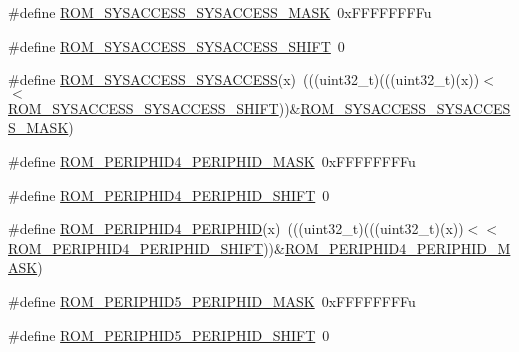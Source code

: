 \begin{DoxyCompactItemize}
\item 
\#define \hyperlink{group___r_o_m___register___masks_gab3acbf5e9fc0f3ad82ae4e0004d0216d}{R\+O\+M\+\_\+\+S\+Y\+S\+A\+C\+C\+E\+S\+S\+\_\+\+S\+Y\+S\+A\+C\+C\+E\+S\+S\+\_\+\+M\+A\+SK}~0x\+F\+F\+F\+F\+F\+F\+F\+Fu
\item 
\#define \hyperlink{group___r_o_m___register___masks_ga3490b2f91c6a67625992dbc90f0e5a27}{R\+O\+M\+\_\+\+S\+Y\+S\+A\+C\+C\+E\+S\+S\+\_\+\+S\+Y\+S\+A\+C\+C\+E\+S\+S\+\_\+\+S\+H\+I\+FT}~0
\item 
\#define \hyperlink{group___r_o_m___register___masks_ga169845d2d1c068c7ef4998e8801ac713}{R\+O\+M\+\_\+\+S\+Y\+S\+A\+C\+C\+E\+S\+S\+\_\+\+S\+Y\+S\+A\+C\+C\+E\+SS}(x)~(((uint32\+\_\+t)(((uint32\+\_\+t)(x))$<$$<$\hyperlink{group___r_o_m___register___masks_ga3490b2f91c6a67625992dbc90f0e5a27}{R\+O\+M\+\_\+\+S\+Y\+S\+A\+C\+C\+E\+S\+S\+\_\+\+S\+Y\+S\+A\+C\+C\+E\+S\+S\+\_\+\+S\+H\+I\+FT}))\&\hyperlink{group___r_o_m___register___masks_gab3acbf5e9fc0f3ad82ae4e0004d0216d}{R\+O\+M\+\_\+\+S\+Y\+S\+A\+C\+C\+E\+S\+S\+\_\+\+S\+Y\+S\+A\+C\+C\+E\+S\+S\+\_\+\+M\+A\+SK})
\item 
\#define \hyperlink{group___r_o_m___register___masks_gad17e07925ea552218422be227581a58f}{R\+O\+M\+\_\+\+P\+E\+R\+I\+P\+H\+I\+D4\+\_\+\+P\+E\+R\+I\+P\+H\+I\+D\+\_\+\+M\+A\+SK}~0x\+F\+F\+F\+F\+F\+F\+F\+Fu
\item 
\#define \hyperlink{group___r_o_m___register___masks_ga4ea3b3a45be6eb8eb4372f565af2d5d9}{R\+O\+M\+\_\+\+P\+E\+R\+I\+P\+H\+I\+D4\+\_\+\+P\+E\+R\+I\+P\+H\+I\+D\+\_\+\+S\+H\+I\+FT}~0
\item 
\#define \hyperlink{group___r_o_m___register___masks_gab4f815fbbdfce7ff4af7ddeca74eff41}{R\+O\+M\+\_\+\+P\+E\+R\+I\+P\+H\+I\+D4\+\_\+\+P\+E\+R\+I\+P\+H\+ID}(x)~(((uint32\+\_\+t)(((uint32\+\_\+t)(x))$<$$<$\hyperlink{group___r_o_m___register___masks_ga4ea3b3a45be6eb8eb4372f565af2d5d9}{R\+O\+M\+\_\+\+P\+E\+R\+I\+P\+H\+I\+D4\+\_\+\+P\+E\+R\+I\+P\+H\+I\+D\+\_\+\+S\+H\+I\+FT}))\&\hyperlink{group___r_o_m___register___masks_gad17e07925ea552218422be227581a58f}{R\+O\+M\+\_\+\+P\+E\+R\+I\+P\+H\+I\+D4\+\_\+\+P\+E\+R\+I\+P\+H\+I\+D\+\_\+\+M\+A\+SK})
\item 
\#define \hyperlink{group___r_o_m___register___masks_ga39e8a3441c79c42651efba9100e653a7}{R\+O\+M\+\_\+\+P\+E\+R\+I\+P\+H\+I\+D5\+\_\+\+P\+E\+R\+I\+P\+H\+I\+D\+\_\+\+M\+A\+SK}~0x\+F\+F\+F\+F\+F\+F\+F\+Fu
\item 
\#define \hyperlink{group___r_o_m___register___masks_ga083194b41cf1109fe5a6e235b2c1f89a}{R\+O\+M\+\_\+\+P\+E\+R\+I\+P\+H\+I\+D5\+\_\+\+P\+E\+R\+I\+P\+H\+I\+D\+\_\+\+S\+H\+I\+FT}~0

\end{DoxyCompactItemize}
